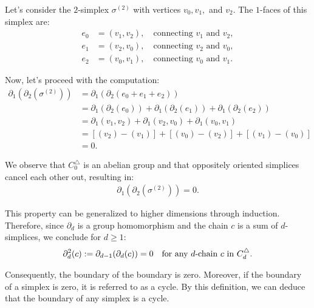 \begin{example}
	Let's consider the \(2\)-simplex \( \sigma^{(2)} \) with vertices \( v_{0}, v_{1}, \) and \( v_{2} \). The \( 1 \)-faces of this simplex are:
	\begin{align}
		e_{0} & = (v_{1}, v_{2}), \quad \text{connecting } v_{1} \text{ and } v_{2}, \nonumber\\
		e_{1} & = (v_{2}, v_{0}), \quad \text{connecting } v_{2} \text{ and } v_{0}, \nonumber\\
		e_{2} & = (v_{0}, v_{1}), \quad \text{connecting } v_{0} \text{ and } v_{1}. 
	\end{align}
				
	Now, let's proceed with the computation:
	\begin{align}
		\partial_1(\partial_2(\sigma^{(2)})) & = \partial_1(\partial_2(e_{0} + e_{1} + e_{2})) \nonumber\\
		                                 & = \partial_1(\partial_2(e_{0})) + \partial_1(\partial_2(e_{1})) + \partial_1(\partial_2(e_{2})) \nonumber\\
		                                 & = \partial_1(v_{1}, v_{2}) + \partial_1(v_{2}, v_{0}) + \partial_1(v_{0}, v_{1}) \nonumber\\
		                                 & = [(v_{2}) - (v_{1})] + [(v_{0}) - (v_{2})] + [(v_{1}) - (v_{0})] \nonumber\\
		                                 & = 0.                                                                       
	\end{align}
				
	We observe that \( C^{\triangle}_{0} \) is an abelian group and that oppositely oriented simplices cancel each other out, resulting in:
	\begin{align}
		\partial_{1}(\partial_2(\sigma^{(2)})) = 0. 
	\end{align}
				
	This property can be generalized to higher dimensions through induction. Therefore, since \( \partial_d \) is a group homomorphism and the chain \( c \) is a sum of \( d \)-simplices, we conclude for $d \geq 1$:
	\begin{align}
		\partial^{2}_d(c) := \partial_{d-1}(\partial_{d}(c)) = 0 \quad \text{for any \( d \)-chain \( c \) in } C^{\triangle}_{d}. 
	\end{align}
				
	Consequently, the boundary of the boundary is zero. Moreover, if the boundary of a simplex is zero, it is referred to as a cycle. By this definition, we can deduce that the boundary of any simplex is a cycle.
\end{example}

